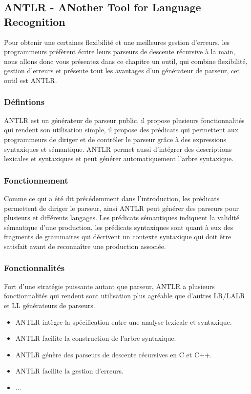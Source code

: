 \documentclass{article}
\begin{document}
\subsection{ANTLR - ANother Tool for Language Recognition}
Pour obtenir une certaines flexibilité et une meilleures gestion d’erreurs, les programmeurs préfèrent écrire leurs parseurs de descente récursive à la main, nous allons donc vous présentez dans ce chapitre un outil, qui combine flexibilité, gestion d’erreurs  et présente tout les avantages d’un générateur de parseur, cet outil est ANTLR.
\subsubsection{Défintions}
ANTLR \cite{refANTLR} est un générateur de parseur public, il propose plusieurs fonctionnalités qui rendent son utilisation simple, il propose  des prédicats qui permettent aux programmeurs de diriger et de contrôler le parseur grâce à des expressions syntaxiques et sémantique.
ANTLR permet aussi d’intégrer des  descriptions lexicales et syntaxiques et peut générer automatiquement l’arbre syntaxique.
\subsubsection{Fonctionnement}
Comme ce qui a été dit précédemment dans l’introduction, les prédicats permettent de diriger le parseur, ainsi ANTLR peut générer des parseurs pour plusieurs et différents langages.
Les prédicats sémantiques indiquent la validité sémantique d’une production, les prédicats syntaxiques sont quant à eux des fragments de grammaires qui décrivent un contexte syntaxique qui doit être satisfait avant de reconnaître une production associée.
\subsubsection{Fonctionnalités}
Fort d’une stratégie puissante autant que parseur, ANTLR a plusieurs fonctionnalités qui rendent sont utilisation plus agréable que d’autres LR/LALR et LL générateurs de parseurs.
\begin{itemize}
\item ANTLR  intègre la spécification entre une analyse lexicale et syntaxique.
			\item ANTLR facilite la construction de l’arbre syntaxique.
			\item ANTLR génère des parseurs de descente récursives en C et C++.
			\item ANTLR   facilite la gestion d’erreurs.
			\item ...
\end{itemize}
\end{document}
